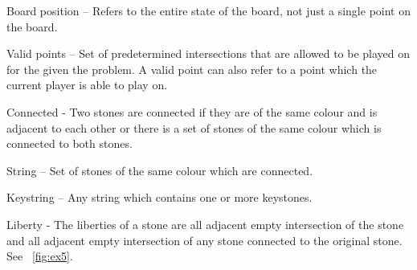 \documentclass{l4proj}
\begin{document}
Board position – Refers to the entire state of the board, not just a single point on the board.

Valid points – Set of predetermined intersections that are allowed to be played on for the given the problem. A valid point can also refer to a point which the current player is able to play on.

Connected - Two stones are connected if they are of the same colour and is adjacent to each other or there is a set of stones of the same colour which is connected to both stones.

String – Set of stones of the same colour which are connected.

Keystring – Any string which contains one or more keystones.


Liberty - The liberties of a stone are all adjacent empty intersection of the stone and all adjacent empty intersection of any stone connected to the original stone. See ~\autoref{fig:ex5}.
\end{document}

